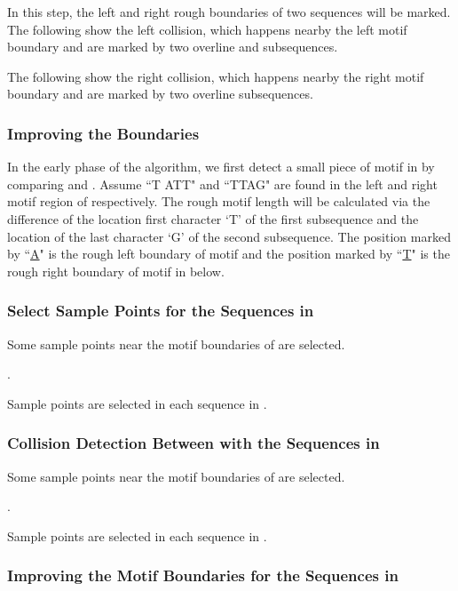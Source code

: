\documentclass[11pt]{article}
\begin{document}
In this step, the left and right rough boundaries of two sequences will be marked.
The following show the left collision, which happens nearby the left
motif boundary and are marked by two overline  and
 subsequences.



The following show the right collision, which happens nearby the
right motif boundary and are marked by two overline
 subsequences.


\subsubsection{Improving the Boundaries}


In the early phase of the algorithm, we first detect a small piece
of motif in  by comparing  and . Assume ``T{\small
A}TT" and ``TTAG" are found in the left and right motif region of
 respectively. The rough motif length will be calculated via
the difference of the location first character `T' of the first
subsequence and the location of the last character `G' of the
second subsequence. The position marked by ``\underline{A}" is the
rough left boundary of motif and the position marked by
``\underline{T}" is the rough right boundary of motif in 
below.


\subsubsection{Select Sample Points for the Sequences in }

Some sample points near the motif boundaries of  are selected.

 .

Sample points are selected in each sequence in .




\subsubsection{Collision Detection Between  with the Sequences in }

Some sample points near the motif boundaries of  are selected.

 .

Sample points are selected in each sequence in .




\subsubsection{Improving the Motif Boundaries for the Sequences in }
\end{document}
